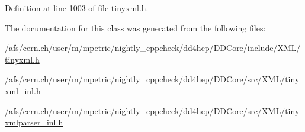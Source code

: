 Definition at line 1003 of file tinyxml.\+h.



The documentation for this class was generated from the following files\+:\begin{DoxyCompactItemize}
\item 
/afs/cern.\+ch/user/m/mpetric/nightly\+\_\+cppcheck/dd4hep/\+D\+D\+Core/include/\+X\+M\+L/\hyperlink{tinyxml_8h}{tinyxml.\+h}\item 
/afs/cern.\+ch/user/m/mpetric/nightly\+\_\+cppcheck/dd4hep/\+D\+D\+Core/src/\+X\+M\+L/\hyperlink{tinyxml__inl_8h}{tinyxml\+\_\+inl.\+h}\item 
/afs/cern.\+ch/user/m/mpetric/nightly\+\_\+cppcheck/dd4hep/\+D\+D\+Core/src/\+X\+M\+L/\hyperlink{tinyxmlparser__inl_8h}{tinyxmlparser\+\_\+inl.\+h}\end{DoxyCompactItemize}
